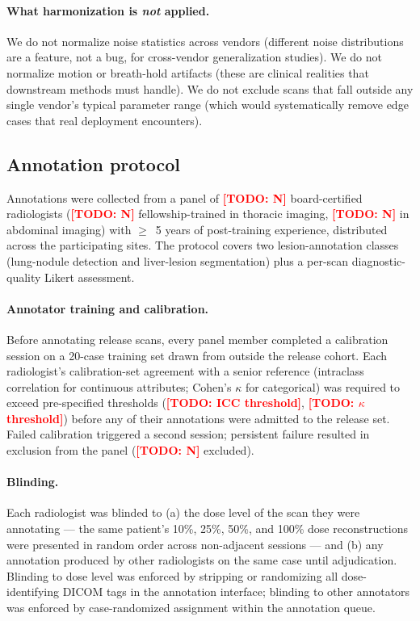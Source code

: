 \documentclass[twoside,11pt]{article}
\newcommand{\todo}[1]{\textcolor{red}{\textbf{[TODO: #1]}}}
\begin{document}
\paragraph{What harmonization is \emph{not} applied.} We do not normalize noise statistics across vendors (different noise distributions are a feature, not a bug, for cross-vendor generalization studies). We do not normalize motion or breath-hold artifacts (these are clinical realities that downstream methods must handle). We do not exclude scans that fall outside any single vendor's typical parameter range (which would systematically remove edge cases that real deployment encounters).

\subsection*{Annotation protocol}

Annotations were collected from a panel of \todo{N} board-certified radiologists (\todo{N} fellowship-trained in thoracic imaging, \todo{N} in abdominal imaging) with $\geq$~5 years of post-training experience, distributed across the participating sites. The protocol covers two lesion-annotation classes (lung-nodule detection and liver-lesion segmentation) plus a per-scan diagnostic-quality Likert assessment.

\paragraph{Annotator training and calibration.} Before annotating release scans, every panel member completed a calibration session on a 20-case training set drawn from outside the release cohort. Each radiologist's calibration-set agreement with a senior reference (intraclass correlation for continuous attributes; Cohen's $\kappa$ for categorical) was required to exceed pre-specified thresholds (\todo{ICC threshold}, \todo{$\kappa$ threshold}) before any of their annotations were admitted to the release set. Failed calibration triggered a second session; persistent failure resulted in exclusion from the panel (\todo{N} excluded).

\paragraph{Blinding.} Each radiologist was blinded to (a) the dose level of the scan they were annotating --- the same patient's 10\%, 25\%, 50\%, and 100\% dose reconstructions were presented in random order across non-adjacent sessions --- and (b) any annotation produced by other radiologists on the same case until adjudication. Blinding to dose level was enforced by stripping or randomizing all dose-identifying DICOM tags in the annotation interface; blinding to other annotators was enforced by case-randomized assignment within the annotation queue.
\end{document}
